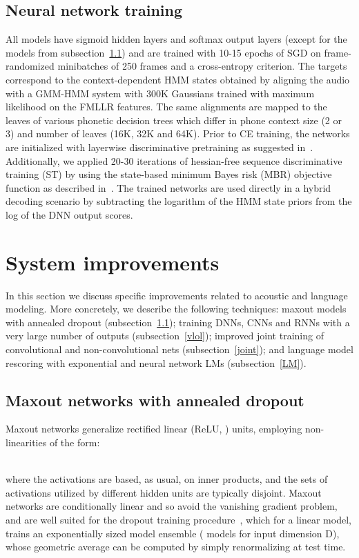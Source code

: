 \documentclass[a4paper]{article}
\begin{document}
\subsection{Neural network training} 
All models have sigmoid hidden layers and softmax output layers
(except for the models from subsection~\ref{maxout}) and are trained
with 10-15 epochs of SGD on frame-randomized minibatches of 250 frames
and a cross-entropy criterion. The targets correspond to the
context-dependent HMM states obtained by aligning the audio with a
GMM-HMM system with 300K Gaussians trained with maximum likelihood on
the FMLLR features. The same alignments are mapped to the leaves of various
phonetic decision trees which differ in phone context size
(2 or 3) and number of leaves (16K, 32K and
64K). Prior to CE training, the networks are initialized with
layerwise discriminative pretraining as suggested
in~\cite{seide11}. Additionally, we applied 20-30 iterations of
hessian-free sequence discriminative training (ST) by using the state-based
minimum Bayes risk (MBR) objective function as described
in~\cite{bedk12}. The trained networks are used directly in a
hybrid decoding scenario by subtracting the logarithm of the HMM state
priors from the log of the DNN output scores.

\section{System improvements}
\label{improvements}

In this section we discuss specific improvements related to acoustic
and language modeling. More concretely, we describe the following
techniques: maxout models with annealed dropout
(subsection~\ref{maxout}); training DNNs, CNNs and RNNs with a very
large number of outputs (subsection~\ref{vlol}); improved joint
training of convolutional and non-convolutional nets
(subsection~\ref{joint}); and language model rescoring with
exponential and neural network LMs (subsection~\ref{LM}).

\subsection{Maxout networks with annealed dropout}
\label{maxout}
Maxout networks \cite{goodfellow13} generalize rectified linear
(ReLU, ) units, employing non-linearities of the form:

~~\\
where the activations  are based, as usual, on
inner products, and the sets of activations  utilized by
different hidden units are typically disjoint. Maxout networks are
conditionally linear and so avoid the vanishing gradient problem, and
are well suited for the dropout training
procedure~\cite{srivastava14}, which for a linear model, trains an
exponentially sized model ensemble ( models for input dimension
D), whose geometric average can be computed by simply renormalizing at
test time.
\end{document}
